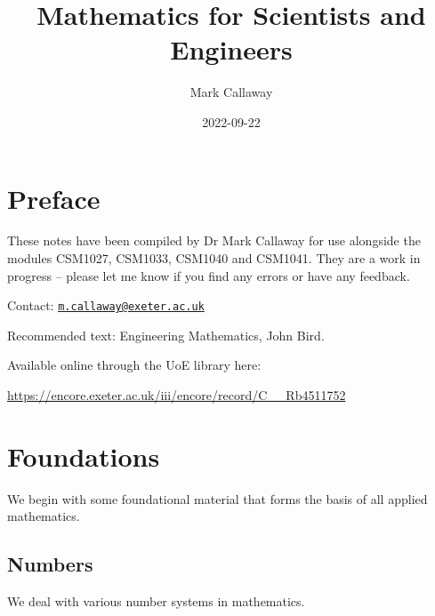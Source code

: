 \documentclass[
]{book}
\title{Mathematics for Scientists and Engineers}
\author{Mark Callaway}
\date{2022-09-22}
\theoremstyle{definition}
\theoremstyle{definition}
\theoremstyle{definition}
\theoremstyle{definition}
\theoremstyle{remark}
\begin{document}
\maketitle

{
\setcounter{tocdepth}{1}
\tableofcontents
}
\hypertarget{preface}{%
\chapter*{Preface}\label{preface}}

These notes have been compiled by Dr Mark Callaway for use alongside the modules CSM1027, CSM1033, CSM1040 and CSM1041. They are a work in progress -- please let me know if you find any errors or have any feedback.

Contact: \href{mailto:m.callaway@exeter.ac.uk}{\nolinkurl{m.callaway@exeter.ac.uk}}

Recommended text: Engineering Mathematics, John Bird.

Available online through the UoE library here:

\url{https://encore.exeter.ac.uk/iii/encore/record/C__Rb4511752}

\hypertarget{foundations}{%
\chapter{Foundations}\label{foundations}}

We begin with some foundational material that forms the basis of all applied mathematics.

\hypertarget{numbers}{%
\section{Numbers}\label{numbers}}

We deal with various number systems in mathematics.
\end{document}
